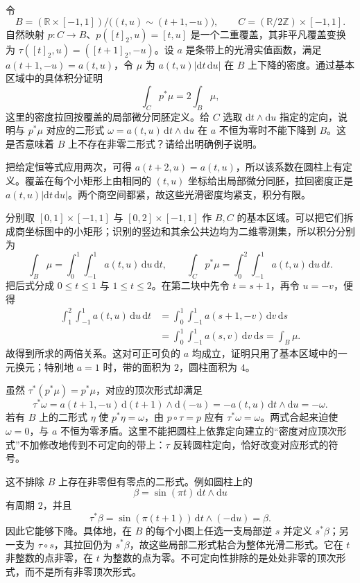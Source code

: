 \begin{exercise}\label{g1:ex:mobius-double-cover-integral}
	令
	\[
		B=(\mathbb R\times[-1,1])/\bigl((t,u)\sim(t+1,-u)\bigr),\qquad
		C=(\mathbb R/2\mathbb Z)\times[-1,1].
	\]
	自然映射 \(p:C\to B\)、\(p([t]_2,u)=[t,u]\) 是一个二重覆盖，其非平凡覆盖变换为 \(\tau([t]_2,u)=([t+1]_2,-u)\)。设 \(a\) 是条带上的光滑实值函数，满足 \(a(t+1,-u)=a(t,u)\)，令 \(\mu\) 为 \(a(t,u)|\mathrm{d}t\,\mathrm{d}u|\) 在 \(B\) 上下降的密度。通过基本区域中的具体积分证明
	\[
		\int_C p^*\mu=2\int_B\mu,
	\]
	这里的密度拉回按覆盖的局部微分同胚定义。给 \(C\) 选取 \(\mathrm{d}t\wedge\mathrm{d}u\) 指定的定向，说明与 \(p^*\mu\) 对应的二形式 \(\omega=a(t,u)\,\mathrm{d}t\wedge\mathrm{d}u\) 在 \(a\) 不恒为零时不能下降到 \(B\)。这是否意味着 \(B\) 上不存在非零二形式？请给出明确例子说明。
\end{exercise}
\begin{solution}
	把给定恒等式应用两次，可得 \(a(t+2,u)=a(t,u)\)，所以该系数在圆柱上有定义。覆盖在每个小矩形上由相同的 \((t,u)\) 坐标给出局部微分同胚，拉回密度正是 \(a(t,u)|\mathrm{d}t\,\mathrm{d}u|\)。两个商空间都紧，故这些光滑密度均紧支，积分有限。

	分别取 \([0,1]\times[-1,1]\) 与 \([0,2]\times[-1,1]\) 作 \(B,C\) 的基本区域。可以把它们拆成商坐标图中的小矩形；识别的竖边和其余公共边均为二维零测集，所以积分分别为
	\[
		\int_B\mu=\int_0^1\int_{-1}^1a(t,u)\,\mathrm{d}u\,\mathrm{d}t,
		\qquad
		\int_Cp^*\mu=\int_0^2\int_{-1}^1a(t,u)\,\mathrm{d}u\,\mathrm{d}t.
	\]
	把后式分成 \(0\leq t\leq1\) 与 \(1\leq t\leq2\)。在第二块中先令 \(t=s+1\)，再令 \(u=-v\)，便得
	\begin{align*}
		\int_1^2\int_{-1}^1a(t,u)\,\mathrm{d}u\,\mathrm{d}t
		&=\int_0^1\int_{-1}^1a(s+1,-v)\,\mathrm{d}v\,\mathrm{d}s\\
		&=\int_0^1\int_{-1}^1a(s,v)\,\mathrm{d}v\,\mathrm{d}s
		=\int_B\mu.
	\end{align*}
	故得到所求的两倍关系。这对可正可负的 \(a\) 均成立，证明只用了基本区域中的一元换元；特别地 \(a=1\) 时，带的面积为 \(2\)，圆柱面积为 \(4\)。

	虽然 \(\tau^*(p^*\mu)=p^*\mu\)，对应的顶次形式却满足
	\[
		\tau^*\omega=a(t+1,-u)\,\mathrm{d}(t+1)\wedge\mathrm{d}(-u)
		=-a(t,u)\,\mathrm{d}t\wedge\mathrm{d}u=-\omega.
	\]
	若有 \(B\) 上的二形式 \(\eta\) 使 \(p^*\eta=\omega\)，由 \(p\circ\tau=p\) 应有 \(\tau^*\omega=\omega\)。两式合起来迫使 \(\omega=0\)，与 \(a\) 不恒为零矛盾。这里不能把圆柱上依靠定向建立的“密度对应顶次形式”不加修改地传到不可定向的带上：\(\tau\) 反转圆柱定向，恰好改变对应形式的符号。

	这不排除 \(B\) 上存在非零但有零点的二形式。例如圆柱上的
	\[
		\beta=\sin(\pi t)\,\mathrm{d}t\wedge\mathrm{d}u
	\]
	有周期 \(2\)，并且
	\[
		\tau^*\beta=\sin(\pi(t+1))\,\mathrm{d}t\wedge(-\mathrm{d}u)=\beta.
	\]
	因此它能够下降。具体地，在 \(B\) 的每个小图上任选一支局部逆 \(s\) 并定义 \(s^*\beta\)；另一支为 \(\tau\circ s\)，其拉回仍为 \(s^*\beta\)，故这些局部二形式粘合为整体光滑二形式。它在 \(t\) 非整数的点非零，在 \(t\) 为整数的点为零。不可定向性排除的是处处非零的顶次形式，而不是所有非零顶次形式。
\end{solution}

